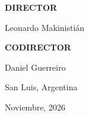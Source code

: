 \begin{titlepage}
  \vspace{0.55cm}
  {\small\bfseries DIRECTOR\par}
  \vspace{0.12cm}
  {\normalsize Leonardo Makinistián\par}

  \vspace{0.55cm}
  {\small\bfseries CODIRECTOR\par}
  \vspace{0.12cm}
  {\normalsize Daniel Guerreiro\par}

  \vfill

  {\normalsize San Luis, Argentina\par}
  \vspace{0.1cm}
  {\normalsize Noviembre, 2026\par}

\end{titlepage}
